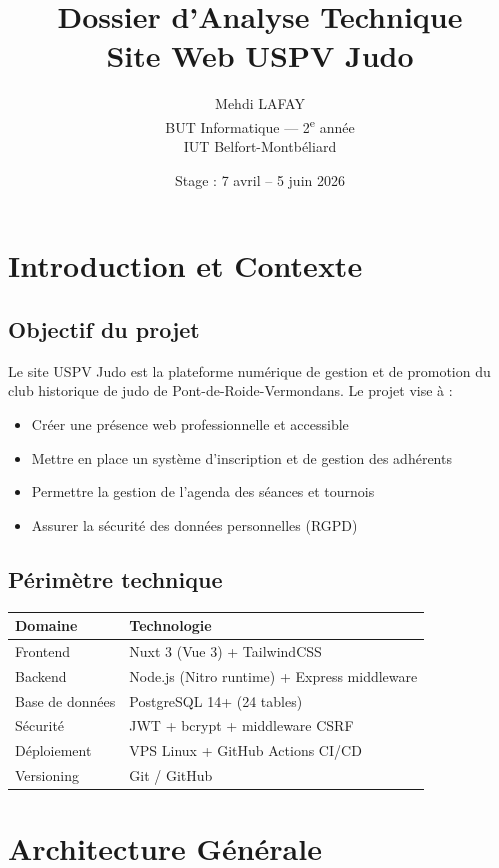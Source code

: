 \documentclass[11pt,a4paper]{article}
\title{\textbf{Dossier d'Analyse Technique}\\
{\large Site Web USPV Judo}}
\author{Mehdi LAFAY\\
BUT Informatique --- 2\textsuperscript{e} année\\
IUT Belfort-Montbéliard}
\date{Stage : 7 avril -- 5 juin 2026}
\begin{document}
\maketitle
\tableofcontents
\newpage

\section{Introduction et Contexte}

\subsection{Objectif du projet}
Le site USPV Judo est la plateforme numérique de gestion et de promotion du club historique de judo de Pont-de-Roide-Vermondans. Le projet vise à :
\begin{itemize}
  \item Créer une présence web professionnelle et accessible
  \item Mettre en place un système d'inscription et de gestion des adhérents
  \item Permettre la gestion de l'agenda des séances et tournois
  \item Assurer la sécurité des données personnelles (RGPD)
\end{itemize}

\subsection{Périmètre technique}
\begin{tabular}{lp{10cm}}
\toprule
\textbf{Domaine} & \textbf{Technologie} \\
\midrule
Frontend & Nuxt 3 (Vue 3) + TailwindCSS \\
Backend & Node.js (Nitro runtime) + Express middleware \\
Base de données & PostgreSQL 14+ (24 tables) \\
Sécurité & JWT + bcrypt + middleware CSRF \\
Déploiement & VPS Linux + GitHub Actions CI/CD \\
Versioning & Git / GitHub \\
\bottomrule
\end{tabular}

\section{Architecture Générale}
\end{document}
